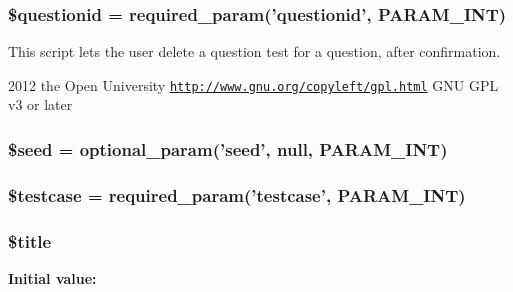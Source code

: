 \label{questiontestdelete_8php_ab3dbd2b3f38fc871b3aba59ed0657c55}
\hypertarget{questiontestdelete_8php_a0b8a9e6194c5b1ca51e0f19a198c19d8}{
\subsubsection[{\$questionid}]{\setlength{\rightskip}{0pt plus 5cm}\$questionid = required\_\-param('questionid', PARAM\_\-INT)}}
\label{questiontestdelete_8php_a0b8a9e6194c5b1ca51e0f19a198c19d8}
This script lets the user delete a question test for a question, after confirmation.

2012 the Open University  \href{http://www.gnu.org/copyleft/gpl.html}{\tt http://www.gnu.org/copyleft/gpl.html} GNU GPL v3 or later \hypertarget{questiontestdelete_8php_a4aea6700edf05cf13c65dc0e758c9ad3}{
\subsubsection[{\$seed}]{\setlength{\rightskip}{0pt plus 5cm}\$seed = optional\_\-param('seed', null, PARAM\_\-INT)}}
\label{questiontestdelete_8php_a4aea6700edf05cf13c65dc0e758c9ad3}
\hypertarget{questiontestdelete_8php_ae640ef9490b2598569406e3654f480b6}{
\subsubsection[{\$testcase}]{\setlength{\rightskip}{0pt plus 5cm}\$testcase = required\_\-param('testcase', PARAM\_\-INT)}}
\label{questiontestdelete_8php_ae640ef9490b2598569406e3654f480b6}
\hypertarget{questiontestdelete_8php_ada57e7bb7c152edad18fe2f166188691}{
\subsubsection[{\$title}]{\setlength{\rightskip}{0pt plus 5cm}\$title}}
\label{questiontestdelete_8php_ada57e7bb7c152edad18fe2f166188691}
{\bfseries Initial value:}
